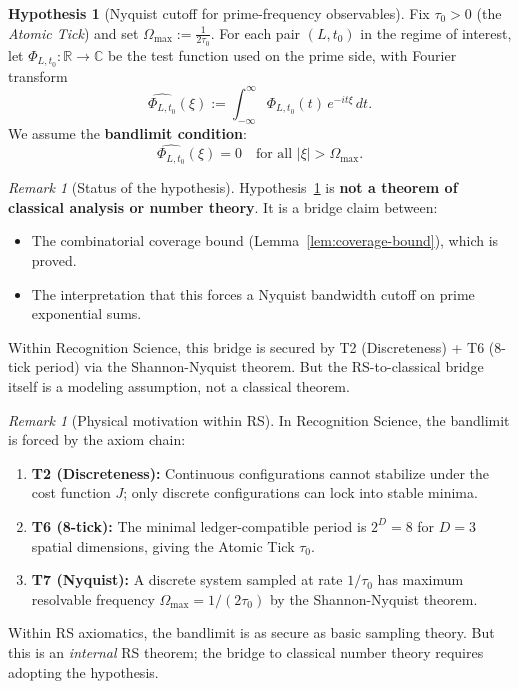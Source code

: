 \documentclass[11pt]{article}
\theoremstyle{definition}
\theoremstyle{remark}
\newtheorem{remark}[theorem]{Remark}
\theoremstyle{definition}
\newtheorem{hypothesis}[theorem]{Hypothesis}
\begin{document}
\begin{hypothesis}[Nyquist cutoff for prime-frequency observables]\label{hyp:nyquist-cutoff}
Fix $\tau_0 > 0$ (the \emph{Atomic Tick}) and set $\Omega_{\max} := \frac{1}{2\tau_0}$.
For each pair $(L, t_0)$ in the regime of interest, let $\Phi_{L,t_0}: \mathbb{R} \to \mathbb{C}$ be the test function used on the prime side, with Fourier transform
\[
  \widehat{\Phi_{L,t_0}}(\xi) := \int_{-\infty}^{\infty} \Phi_{L,t_0}(t)\,e^{-it\xi}\,dt.
\]
We assume the \textbf{bandlimit condition}:
\begin{equation}\label{eq:bandlimit}
  \tag{T7-Hyp}
  \widehat{\Phi_{L,t_0}}(\xi) = 0 \quad \text{for all } |\xi| > \Omega_{\max}.
\end{equation}
\end{hypothesis}

\begin{remark}[Status of the hypothesis]\label{rem:hyp-status}
Hypothesis~\ref{hyp:nyquist-cutoff} is \textbf{not a theorem of classical analysis or number theory}. It is a bridge claim between:
\begin{itemize}
\item The combinatorial coverage bound (Lemma~\ref{lem:coverage-bound}), which is proved.
\item The interpretation that this forces a Nyquist bandwidth cutoff on prime exponential sums.
\end{itemize}
Within Recognition Science, this bridge is secured by T2 (Discreteness) + T6 (8-tick period) via the Shannon-Nyquist theorem. But the RS-to-classical bridge itself is a modeling assumption, not a classical theorem.
\end{remark}

\begin{remark}[Physical motivation within RS]\label{rem:T7-motivation}
In Recognition Science, the bandlimit is forced by the axiom chain:
\begin{enumerate}
\item \textbf{T2 (Discreteness):} Continuous configurations cannot stabilize under the cost function $J$; only discrete configurations can lock into stable minima.
\item \textbf{T6 (8-tick):} The minimal ledger-compatible period is $2^D = 8$ for $D = 3$ spatial dimensions, giving the Atomic Tick $\tau_0$.
\item \textbf{T7 (Nyquist):} A discrete system sampled at rate $1/\tau_0$ has maximum resolvable frequency $\Omega_{\max} = 1/(2\tau_0)$ by the Shannon-Nyquist theorem.
\end{enumerate}
Within RS axiomatics, the bandlimit is as secure as basic sampling theory. But this is an \emph{internal} RS theorem; the bridge to classical number theory requires adopting the hypothesis.
\end{remark}
\end{document}
